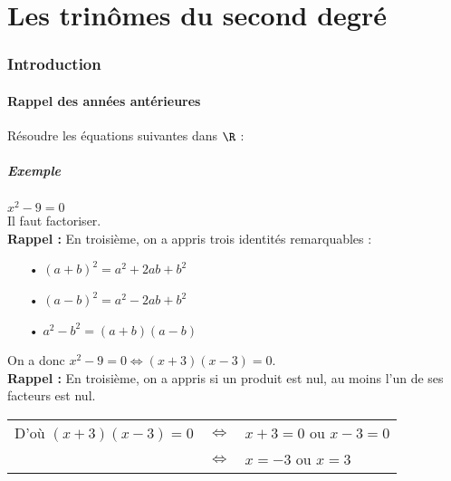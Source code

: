 \ifdefined\COMPLETE
\else
    
    
\fi


\vspace*{-1.5cm}

\part{Les trinômes du second degré}

\section{Introduction}

\subsection{Rappel des années antérieures}

Résoudre les équations suivantes dans $\R$ :

\subsubsection{Exemple }

$x^2 - 9 = 0$ \\

Il faut factoriser. \\

\textbf{Rappel :} En troisième, on a appris trois identités remarquables : \\

\begin{itemize}
\item[•] $\left(a + b \right)^2 = a^2 + 2ab + b^2$ 
\item[•] $\left(a - b \right)^2 = a^2 - 2ab + b^2$ 
\item[•] $a^2 - b^2 = \left(a+b\right)\left(a-b\right)$ 
\end{itemize}

\vspace*{.3cm}

On a donc $x^2 - 9 = 0 \Longleftrightarrow \left(x+3\right)\left(x-3\right) = 0$. \\

\textbf{Rappel :} En troisième, on a appris si un produit est nul, au moins l'un de ses facteurs est nul. \\

\begin{tabular}{lll}
D'où $\left(x+3\right)\left(x-3\right) = 0$ & $ \Longleftrightarrow $ & $  x+3 = 0 $ ou $ x-3 = 0$ \\
& $\Longleftrightarrow$ & $x = -3 $ ou $x=3$ \\
\end{tabular}

